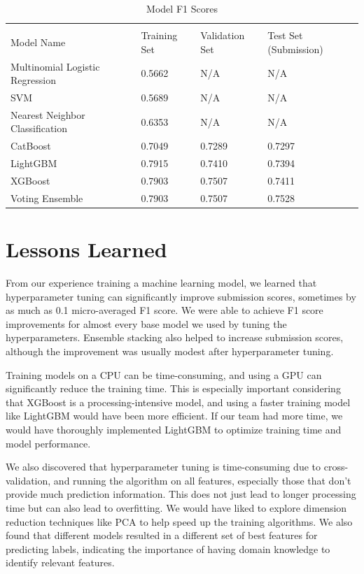 \documentclass{article}
\begin{document}
\begin{table}
  \caption{Model F1 Scores}
  \label{table:1}
  \centering
  \begin{tabular}{llll}
    \toprule
    \multicolumn{2}{c}{}                   \\
    Model Name     & Training Set & Validation Set & Test Set (Submission) \\
    \midrule
    Multinomial Logistic Regression & 0.5662 & N/A & N/A    \\
    SVM & 0.5689 & N/A & N/A      \\
    Nearest Neighbor Classification       & 0.6353 & N/A & N/A \\
    CatBoost      & 0.7049 & 0.7289 & 0.7297 \\
    LightGBM      & 0.7915 & 0.7410 & 0.7394 \\
    XGBoost      & 0.7903 & 0.7507 & 0.7411  \\
    Voting Ensemble      & 0.7903 & 0.7507 & 0.7528  \\
    \bottomrule
  \end{tabular}
\end{table}

\section{Lessons Learned}

From our experience training a machine learning model, we learned that hyperparameter tuning can significantly improve submission scores, sometimes by as much as 0.1 micro-averaged F1 score.
We were able to achieve F1 score improvements for almost every base model we used by tuning the hyperparameters.
Ensemble stacking also helped to increase submission scores, although the improvement was usually modest after hyperparameter tuning. 

Training models on a CPU can be time-consuming, and using a GPU can significantly reduce the training time.
This is especially important considering that XGBoost is a processing-intensive model, and using a faster training model like LightGBM would have been more efficient.
If our team had more time, we would have thoroughly implemented LightGBM to optimize training time and model performance. 

We also discovered that hyperparameter tuning is time-consuming due to cross-validation, and running the algorithm on all features, especially those that don't provide much prediction information.
This does not just lead to longer processing time but can also lead to overfitting. We would have liked to explore dimension reduction techniques like PCA to help speed up the training algorithms.
We also found that different models resulted in a different set of best features for predicting labels, indicating the importance of having domain knowledge to identify relevant features. 
\end{document}

